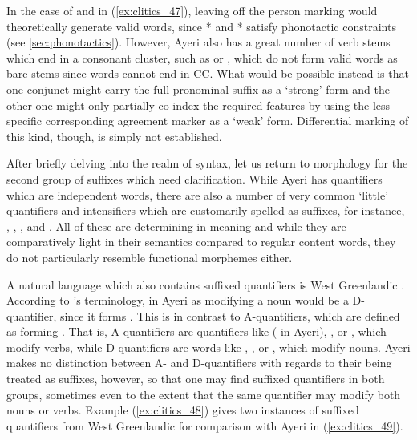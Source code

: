 In the case of  and  in
(\ref{ex:clitics_47}), leaving off the person marking would theoretically
generate valid words, since * and * satisfy
phonotactic constraints (see \autoref{sec:phonotactics}). However, Ayeri also
has a great number of verb stems which end in a consonant cluster, such as
 or , which do not form valid
words as bare stems since words cannot end in CC. What would be possible
instead is that one conjunct might carry the full pronominal suffix as a
`strong' form and the other one might only partially co-index the required
features by using the less specific corresponding agreement marker as a `weak'
form. Differential marking of this kind, though, is simply not established.

\label{clitics_quant}
After briefly delving into the realm of syntax, let us return to morphology for
the second group of suffixes which need clarification. While Ayeri has
quantifiers which are independent words, there are also a number of very common
`little' quantifiers and intensifiers which are customarily spelled as
suffixes, for instance, ,
, , and
. All of these are determining in meaning and while
they are comparatively light in their semantics compared to regular content
words, they do not particularly resemble functional morphemes either.

A natural language which also contains suffixed quantifiers is West Greenlandic
\citep{bittner1995}. According to \citet{bittner1995}'s terminology,
 in Ayeri as modifying a noun would be a D-quantifier, since
it forms .
This is in contrast to A-quantifiers, which are defined as forming
. That is,
A-quantifiers are quantifiers like  ( in Ayeri),
, or , which modify verbs, while D-quantifiers are words
like , , or , which modify nouns. Ayeri makes no
distinction between A- and D-quantifiers with regards to their being treated as
suffixes, however, so that one may find suffixed quantifiers in both groups,
sometimes even to the extent that the same quantifier may modify both nouns or
verbs. Example (\ref{ex:clitics_48}) gives two instances of suffixed
quantifiers from West Greenlandic for comparison with Ayeri in
(\ref{ex:clitics_49}).

